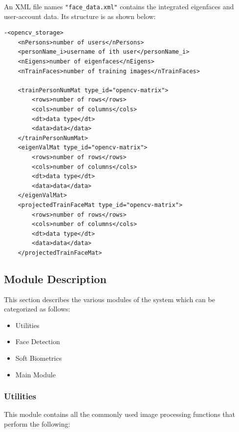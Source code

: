 \documentclass[12pt]{article}			%
\begin{document}
An XML file names \verb+"face_data.xml"+ contains the integrated eigenfaces and user-account data. Its structure is as shown below:
\begin{verbatim}
-<opencv_storage>
	<nPersons>number of users</nPersons>
	<personName_i>username of ith user</personName_i>
	<nEigens>number of eigenfaces</nEigens>
	<nTrainFaces>number of training images</nTrainFaces>
	
	<trainPersonNumMat type_id="opencv-matrix">
		<rows>number of rows</rows>
		<cols>number of columns</cols>
		<dt>data type</dt>
		<data>data</data>
	</trainPersonNumMat>
	<eigenValMat type_id="opencv-matrix">
		<rows>number of rows</rows>
		<cols>number of columns</cols>
		<dt>data type</dt>
		<data>data</data>
	</eigenValMat>
	<projectedTrainFaceMat type_id="opencv-matrix">
		<rows>number of rows</rows>
		<cols>number of columns</cols>
		<dt>data type</dt>
		<data>data</data>
	</projectedTrainFaceMat>
\end{verbatim}

\subsection{ Module Description }
This section describes the various modules of the system which can be categorized as follows:
\begin{itemize}
\item Utilities
\item Face Detection
\item Soft Biometrics
\item Main Module
\end{itemize}

\subsubsection { Utilities }
This module contains all the commonly used image processing functions that perform the following:
\end{document}
